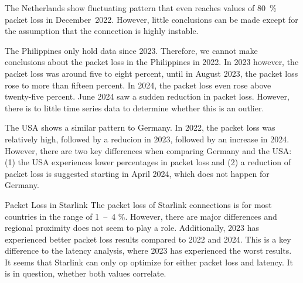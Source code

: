 The Netherlands show fluctuating pattern that even reaches values of 80~\%
packet loss in December~2022. However, little conclusions can be made except
for the assumption that the connection is highly instable.

The Philippines only hold data since 2023. Therefore, we cannot make
conclusions about the packet loss in the Philippines in 2022. In 2023 however,
the packet loss was around five to eight percent, until in August 2023, the
packet loss rose to more than fifteen percent. In 2024, the packet loss even
rose above twenty-five percent. June 2024 saw a sudden reduction in packet
loss. However, there is to little time series data to determine whether this is
an outlier.

The USA shows a similar pattern to Germany. In 2022, the packet loss was
relatively high, followed by a reducion in 2023, followed by an increase in
2024. However, there are two key differences when comparing Germany and the
USA: (1) the USA experiences lower percentages in packet loss and (2) a
reduction of packet loss is suggested starting in April 2024, which does not
happen for Germany.

\begin{takeaway}{Packet Loss in Starlink}
	The packet loss of Starlink connections is for most countries in the
	range of 1~--~4 \%. However, there are major differences and regional
	proximity does not seem to play a role. Additionally, 2023 has
	experienced better packet loss results compared to 2022 and 2024. This
	is a key difference to the latency analysis, where 2023 has experienced
	the worst results. It seems that Starlink can only op optimize for
	either packet loss and latency. It is in question, whether both values
	correlate.
\end{takeaway}

